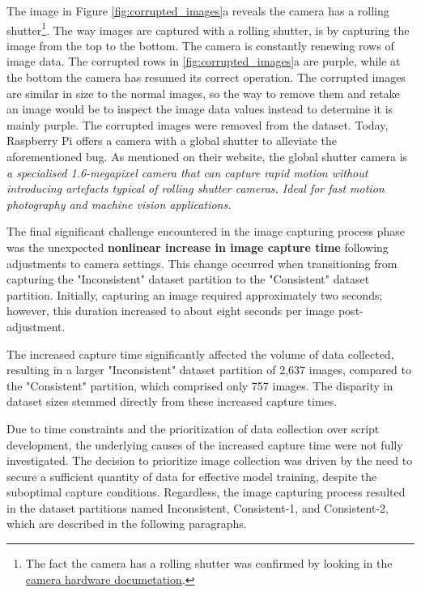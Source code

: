 The image in Figure \ref{fig:corrupted_images}a reveals the camera has a rolling shutter\footnote{The fact the camera has a rolling shutter was confirmed by looking in the \href{https://picamera.readthedocs.io/en/release-1.13/fov.html}{camera hardware documetation}.}. The way images are captured with a rolling shutter, is by capturing the image from the top to the bottom. The camera is constantly renewing rows of image data. The corrupted rows in \ref{fig:corrupted_images}a are purple, while at the bottom the camera has resumed its correct operation. The corrupted images are similar in size to the normal images, so the way to remove them and retake an image would be to inspect the image data values instead to determine it is mainly purple. The corrupted images were removed from the dataset. Today, Raspberry Pi offers a camera with a global shutter to alleviate the aforementioned bug. As mentioned on their website, the global shutter camera is \textit{a specialised 1.6-megapixel camera that can capture rapid motion without introducing artefacts typical of rolling shutter cameras. Ideal for fast motion photography and machine vision applications.}

The final significant challenge encountered in the image capturing process phase was the unexpected \textbf{nonlinear increase in image capture time} following adjustments to camera settings. This change occurred when transitioning from capturing the "Inconsistent" dataset partition to the "Consistent" dataset partition. Initially, capturing an image required approximately two seconds; however, this duration increased to about eight seconds per image post-adjustment.

The increased capture time significantly affected the volume of data collected, resulting in a larger "Inconsistent" dataset partition of 2,637 images, compared to the "Consistent" partition, which comprised only 757 images. The disparity in dataset sizes stemmed directly from these increased capture times.

Due to time constraints and the prioritization of data collection over script development, the underlying causes of the increased capture time were not fully investigated. The decision to prioritize image collection was driven by the need to secure a sufficient quantity of data for effective model training, despite the suboptimal capture conditions. Regardless, the image capturing process resulted in the dataset partitions named Inconsistent, Consistent-1, and Consistent-2, which are described in the following paragraphs. 

